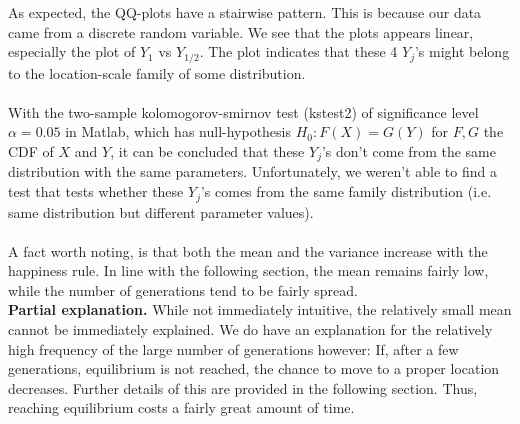 As expected, the QQ-plots have a stairwise pattern. This is because our data came from a discrete random variable. We see that the plots appears linear, especially the plot of $Y_{1}$ vs $Y_{1/2}$. The plot indicates that these 4 $Y_j$'s might belong to the location-scale family of some distribution.\\
\\
With the two-sample kolomogorov-smirnov test (kstest2) of significance level $\alpha=0.05$ in Matlab, which has null-hypothesis $H_0:F(X)=G(Y)$ for $F,G$ the CDF of $X$ and $Y$, it can be concluded that these $Y_j$'s don't come from the same distribution with the same parameters. Unfortunately, we weren't able to find a test that tests whether these $Y_j$'s comes from the same family distribution (i.e. same distribution but different parameter values).\\
\\
A fact worth noting, is that both the mean and the variance increase with the happiness rule. In line with the following section, the mean remains fairly low, while the number of generations tend to be fairly spread.\\
\textbf{Partial explanation.} While not immediately intuitive, the relatively small mean cannot be immediately explained. We do have an explanation for the relatively high frequency of the large number of generations however: If, after a few generations, equilibrium is not reached, the chance to move to a proper location decreases. Further details of this are provided in the following section. Thus, reaching equilibrium costs a fairly great amount of time.

